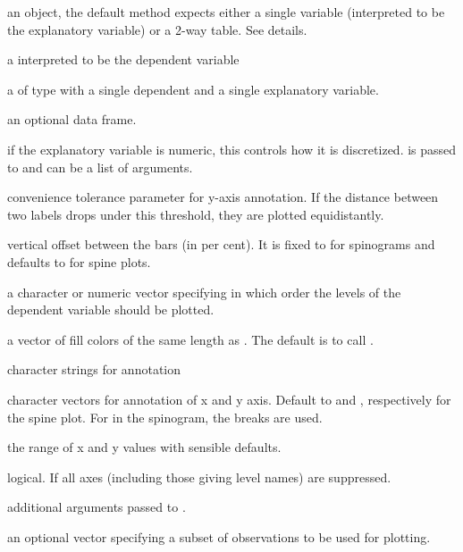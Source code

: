 %
\begin{Arguments}
\begin{ldescription}
\item[\code{x}] an object, the default method expects either a single variable
(interpreted to be the explanatory variable) or a 2-way table.  See
details.
\item[\code{y}] a  interpreted to be the dependent variable
\item[\code{formula}] a  of type  with a single
dependent  and a single explanatory variable.   
\item[\code{data}] an optional data frame.
\item[\code{breaks}] if the explanatory variable is numeric, this controls how
it is discretized.  is passed to  and can
be a list of arguments.
\item[\code{tol.ylab}] convenience tolerance parameter for y-axis annotation.
If the distance between two labels drops under this threshold, they are
plotted equidistantly.
\item[\code{off}] vertical offset between the bars (in per cent). It is fixed to
 for spinograms and defaults to  for spine plots.
\item[\code{ylevels}] a character or numeric vector specifying in which order
the levels of the dependent variable should be plotted.
\item[\code{col}] a vector of fill colors of the same length as .
The default is to call . 
\item[\code{main, xlab, ylab}] character strings for annotation
\item[\code{xaxlabels, yaxlabels}] character vectors for annotation of x and y axis.
Default to  and , respectively for the
spine plot. For  in the spinogram, the breaks are
used.
\item[\code{xlim, ylim}] the range of x and y values with sensible defaults. 
\item[\code{axes}] logical.  If  all axes (including those giving
level names) are suppressed.
\item[\code{...}] additional arguments passed to .
\item[\code{subset}] an optional vector specifying a subset of observations
to be used for plotting.  
\end{ldescription}
\end{Arguments}
